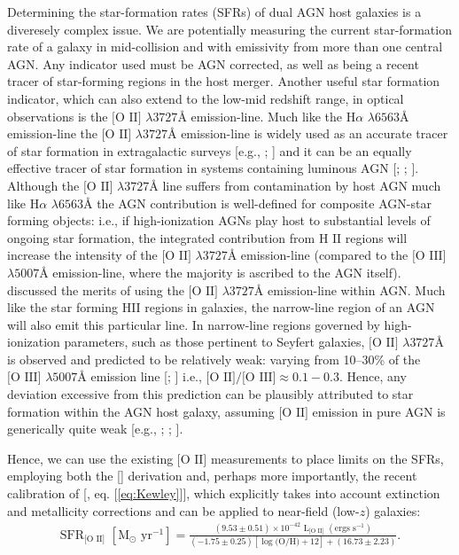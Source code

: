 Determining the star-formation rates (SFRs) of dual AGN host galaxies is a diveresely complex issue. We are potentially measuring the current star-formation rate of a galaxy in mid-collision and with emissivity from more than one central AGN. Any indicator used must be AGN corrected, as well as being a recent tracer of star-forming regions in the host merger. Another useful star formation indicator, which can also extend to the low-mid redshift range, in optical observations is the $\text{[O II]}$ $\lambda{3727}${\AA } emission-line. Much like the $\text{H}\alpha$ $\lambda 6563${\AA } emission-line the $\text{[O II]}$ $\lambda{3727}${\AA } emission-line is widely used as an accurate tracer of star formation in extragalactic surveys [e.g., \cite{Lilly_1996}; \cite{Hippelein_2003}] and it can be an equally effective tracer of star formation in systems containing luminous AGN [\cite{2006ApJ...642..702K}; \cite{2009ApJ...696..396S}; \cite{2012MNRAS.427.2401K}]. Although the $\text{[O II]}$  $\lambda{3727}$Å line suffers from contamination by host AGN much like  $\text{H}\alpha$ $\lambda 6563${\AA } the AGN contribution is well-defined for composite AGN-star forming objects: i.e., if high-ionization AGNs play host to substantial levels of ongoing star formation, the integrated contribution from $\text{H II}$ regions will increase the intensity of the $\text{[O II]}$ $\lambda3727$Å  emission-line (compared to the $\text{[O III]}$ $\lambda5007$Å emission-line, where the majority is ascribed to the AGN itself). \cite{2005ApJ...629..680H} discussed the merits of using the $\text{[O II]}$ $\lambda{3727}$Å emission-line within AGN. Much like the star forming HII regions in galaxies, the narrow-line region of an AGN will also emit this particular line. In narrow-line regions governed by high-ionization parameters, such as those pertinent to Seyfert galaxies, $\text{[O II]}$ $\lambda{3727}$Å is observed and predicted to be relatively weak: varying from 10--30\% of the $\text{[O III]}$ $\lambda{5007}$Å emission line [\cite{Ferland_1986}; \cite{Ho_1993}] i.e., $\text{[O II]/[O III]}\approx{0.1-0.3}$. Hence, any deviation excessive from this prediction can be plausibly attributed to star formation within the AGN host galaxy, assuming $\text{[O II]}$ emission in pure AGN is generically quite weak [e.g., \cite{Ferland_1986}; \cite{Ho_1993}; \cite{2006ApJ...642..702K}]. 

Hence, we can use the existing $\text{[O II]}$ measurements to place limits on the SFRs, employing both the [\cite{Kennicutt_1998}] derivation and, perhaps more importantly, the recent calibration of [\cite{Kewley_2004}, eq. [\ref{eq:Kewley}]], which explicitly takes into account extinction and metallicity corrections and can be applied to near-field (low-$z$) galaxies:
\\
\begin{equation}
\begin{align}
\label{eq:Kewley}
{\text{SFR}}_{\text{[O II]}}\,\,[\text{M}_\odot \text{ yr}^{-1}]=\frac{(9.53\pm{0.51})\times10^{-42}\,\,\text{L}_{\text{[O II]}}\,\,(\text{ergs }\text{s}^{-1})}{(-1.75\pm{0.25})[\log{\text{(O/H)}}+12]+(16.73\pm{2.23})}.
\end{align}
\end{equation}
\\
